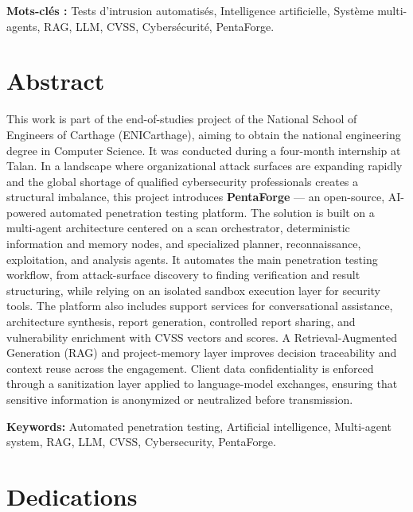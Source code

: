\documentclass[12pt,a4paper]{report}
\begin{document}
\vspace{0.4cm}
\noindent \textbf{Mots-cl\'{e}s :} Tests d'intrusion automatis\'{e}s, Intelligence artificielle,
Syst\`{e}me multi-agents, RAG, LLM, CVSS, Cybers\'{e}curit\'{e}, PentaForge.

\section*{Abstract}

This work is part of the end-of-studies project of the National School of Engineers
of Carthage (ENICarthage), aiming to obtain the national engineering degree in
Computer Science. It was conducted during a four-month internship at Talan.
In a landscape where organizational attack surfaces are expanding rapidly and the
global shortage of qualified cybersecurity professionals creates a structural
imbalance, this project introduces \textbf{PentaForge} --- an open-source, AI-powered
automated penetration testing platform. The solution is built on a multi-agent
architecture centered on a scan orchestrator, deterministic information and memory
nodes, and specialized planner, reconnaissance, exploitation, and analysis agents.
It automates the main penetration testing workflow, from attack-surface discovery to
finding verification and result structuring, while relying on an isolated sandbox
execution layer for security tools. The platform also includes support services for
conversational assistance, architecture synthesis, report generation, controlled
report sharing, and vulnerability enrichment with CVSS vectors and scores. A
Retrieval-Augmented Generation (RAG) and project-memory layer improves decision
traceability and context reuse across the engagement. Client data confidentiality is
enforced through a sanitization layer applied to language-model exchanges, ensuring
that sensitive information is anonymized or neutralized before transmission.

\vspace{0.4cm}
\noindent \textbf{Keywords:} Automated penetration testing, Artificial intelligence,
Multi-agent system, RAG, LLM, CVSS, Cybersecurity, PentaForge.

\newpage
\thispagestyle{fancy}
\section*{Dedications}
\end{document}
